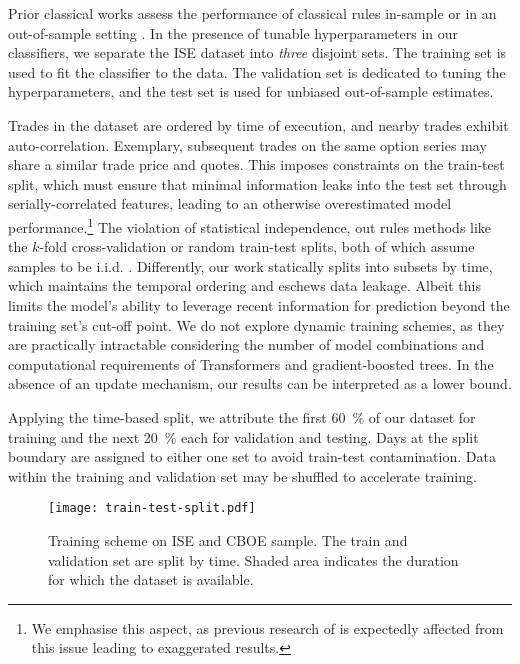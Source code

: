 Prior classical works assess the performance of classical rules in-sample \autocite[cp.][541]{ellisAccuracyTradeClassification2000} or in an out-of-sample setting \autocites[cp.][7--9]{grauerOptionTradeClassification2022}[][3814--3815]{chakrabartyTradeClassificationAlgorithms2007}. In the presence of tunable hyperparameters in our classifiers, we separate the \gls{ISE} dataset into \emph{three} disjoint sets. The training set is used to fit the classifier to the data. The validation set is dedicated to tuning the hyperparameters, and the test set is used for unbiased out-of-sample estimates.

Trades in the dataset are ordered by time of execution, and nearby trades exhibit auto-correlation. Exemplary, subsequent trades on the same option series may share a similar trade price and quotes. This imposes constraints on the train-test split, which must ensure that minimal information leaks into the test set through serially-correlated features, leading to an otherwise overestimated model performance.\footnote{We emphasise this aspect, as previous research of \textcite[][14]{ronenMachineLearningTrade2022} is expectedly affected from this issue leading to exaggerated results.} The violation of statistical independence, out rules methods like the $k$-fold cross-validation or random train-test splits, both of which assume samples to be i.i.d. \autocite[][103--105]{lopezdepradoAdvancesFinancialMachine2018}. Differently, our work statically splits into subsets by time, which maintains the temporal ordering and eschews data leakage. Albeit this limits the model's ability to leverage recent information for prediction beyond the training set's cut-off point. We do not explore dynamic training schemes, as they are practically intractable considering the number of model combinations and computational requirements of Transformers and gradient-boosted trees. In the absence of an update mechanism, our results can be interpreted as a lower bound.

Applying the time-based split, we attribute the first \SI{60}{\percent} of our dataset for training and the next \SI{20}{\percent} each for validation and testing. Days at the split boundary are assigned to either one set to avoid train-test contamination. Data within the training and validation set may be shuffled to accelerate training.

\begin{figure}[ht]
    \centering
    \texttt{[image: train-test-split.pdf]}
    \caption[Training scheme on  and  Sample]{Training scheme on \gls{ISE} and \gls{CBOE} sample. The train and validation set are split by time. Shaded area  indicates the duration for which the dataset is available.}
    \label{fig:train-test-split}
\end{figure}


